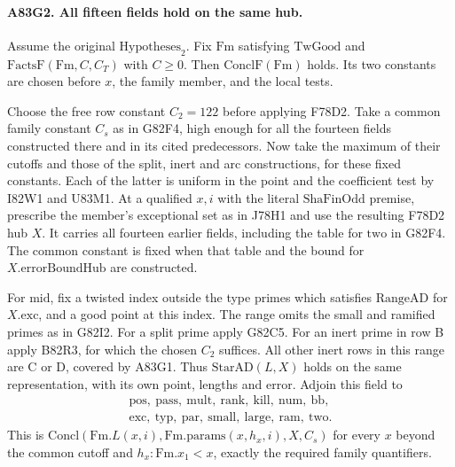 \paragraph{A83G2. All fifteen fields hold on the same hub.}
Assume the original $\mathrm{Hypotheses}_2$.
Fix $\mathrm{Fm}$ satisfying $\mathrm{TwGood}$ and
$\mathrm{FactsF}(\mathrm{Fm},C,C_T)$ with $C\ge0$.
Then $\mathrm{ConclF}(\mathrm{Fm})$ holds. Its two constants
are chosen before $x$, the family member, and the local tests.

Choose the free row constant $C_2=122$ before applying F78D2.
Take a common family constant $C_s$ as in G82F4, high enough
for all the fourteen fields constructed there and in its cited
predecessors. Now take the maximum of their cutoffs and those
of the split, inert and arc constructions, for these fixed
constants. Each of the latter is uniform in the point and the
coefficient test by I82W1 and U83M1. At a qualified $x,i$ with
the literal $\mathrm{ShaFinOdd}$ premise, prescribe the member's
exceptional set as in J78H1 and use the resulting F78D2 hub $X$.
It carries all fourteen earlier fields, including the table for
$\mathrm{two}$ in G82F4. The common constant is fixed when that
table and the bound for $X.\mathrm{errorBoundHub}$ are constructed.

For $\mathrm{mid}$, fix a twisted index outside the type primes
which satisfies $\mathrm{RangeAD}$ for $X.\mathrm{exc}$, and a
good point at this index. The range omits the small and ramified
primes as in G82I2. For a split prime apply G82C5. For an inert
prime in row B apply B82R3, for which the chosen $C_2$ suffices.
All other inert rows in this range are C or D, covered by A83G1.
Thus $\mathrm{StarAD}(L,X)$ holds on the same representation,
with its own point, lengths and error. Adjoin this field to
\[
\begin{gathered}
 \mathrm{pos},\ \mathrm{pass},\ \mathrm{mult},\ \mathrm{rank},\
 \mathrm{kill},\ \mathrm{num},\ \mathrm{bb},\\
 \mathrm{exc},\ \mathrm{typ},\ \mathrm{par},\ \mathrm{small},\
 \mathrm{large},\ \mathrm{ram},\ \mathrm{two}.
\end{gathered}
\]
This is $\mathrm{Concl}(\mathrm{Fm}.L(x,i),\mathrm{Fm}.\mathrm{params}
(x,h_x,i),X,C_s)$ for every $x$ beyond the common cutoff and
$h_x:\mathrm{Fm}.x_1<x$, exactly the required family quantifiers.

